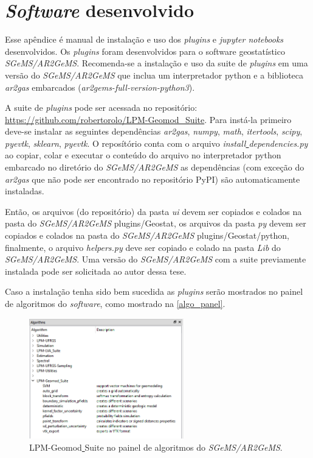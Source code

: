 \chapter{\textit{Software} desenvolvido} \label{software}

Esse apêndice é manual de instalação e uso dos \textit{plugins} e \textit{jupyter notebooks} desenvolvidos. Os \textit{plugins} foram desenvolvidos para o software geostatístico \textit{SGeMS/AR2GeMS}. Recomenda-se a instalação e uso da suite de \textit{plugins} em uma versão do \textit{SGeMS/AR2GeMS} que inclua um interpretador python e a biblioteca \textit{ar2gas} embarcados (\textit{ar2gems-full-version-python3}).

A suite de \textit{plugins} pode ser acessada no repositório: \url{https://github.com/robertorolo/LPM-Geomod_Suite}. Para instá-la primeiro deve-se instalar as seguintes dependências \textit{ar2gas}, \textit{numpy}, \textit{math}, \textit{itertools}, \textit{scipy}, \textit{pyevtk}, \textit{sklearn}, \textit{pyevtk}. O reposítório conta com o arquivo \textit{install\underline{ }dependencies.py} ao copiar, colar e executar o conteúdo do arquivo no interpretador python embarcado no diretório do \textit{SGeMS/AR2GeMS} as dependências (com exceção do \textit{ar2gas} que não pode ser encontrado no repositório PyPI) são automaticamente instaladas.

Então, os arquivos (do repositório) da pasta \textit{ui} devem ser copiados e colados na pasta do \textit{SGeMS/AR2GeMS} plugins/Geostat, os arquivos da pasta \textit{py} devem ser copiados e colados na pasta do \textit{SGeMS/AR2GeMS} plugins/Geostat/python, finalmente, o arquivo \textit{helpers.py} deve ser copiado e colado na pasta \textit{Lib} do \textit{SGeMS/AR2GeMS}. Uma versão do \textit{SGeMS/AR2GeMS} com a suite previamente instalada pode ser solicitada ao autor dessa tese.

Caso a instalação tenha sido bem sucedida as \textit{plugins} serão mostrados no painel de algoritmos do \textit{software}, como mostrado na \autoref{algo_panel}.

\begin{figure}[H]
	\caption{\label{algo_panel} LPM-Geomod\underline{ }Suite no painel de algoritmos do \textit{SGeMS/AR2GeMS}.}
	\centering
		\includegraphics[width=0.6\textwidth]{apendice/imagens/algorithms.PNG}
\end{figure}

